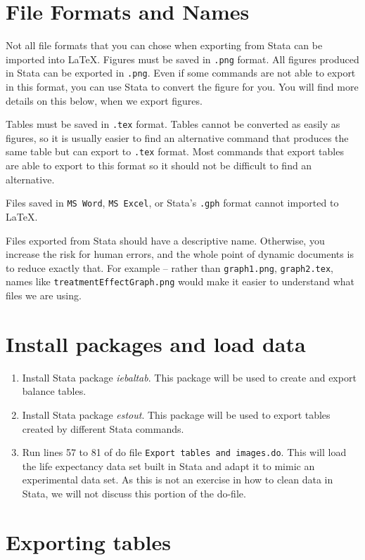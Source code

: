 \documentclass[]{article}
\begin{document}
\section{File Formats and Names}
Not all file formats that you can chose when exporting from Stata can be imported into {\LaTeX}. Figures must be saved in \texttt{.png} format. All figures produced in Stata can be exported in \texttt{.png}. Even if some commands are not able to export in this format, you can use Stata to convert the figure for you. You will find more details on this below, when we export figures. 

Tables must be saved in \texttt{.tex} format. Tables cannot be converted as easily as figures, so it is usually easier to find an alternative command that produces the same table but can export to \texttt{.tex} format. Most commands that export tables are able to export to this format so it should not be difficult to find an alternative.

Files saved in \texttt{MS Word}, \texttt{MS Excel}, or Stata's \texttt{.gph} format cannot imported to {\LaTeX}.

Files exported from Stata should have a descriptive name. Otherwise, you increase the risk for human errors, and the whole point of dynamic documents is to reduce exactly that. For example -- rather than \texttt{graph1.png}, \texttt{graph2.tex}, names like \texttt{treatmentEffectGraph.png} would make it easier to understand what files we are using.

\section{Install packages and load data}

\begin{enumerate}
	\item Install Stata package \emph{iebaltab}. This package will be used to create and export balance tables.
	\item Install Stata package \emph{estout}. This package will be used to export tables created by different Stata commands.
	\item Run lines 57 to 81 of do file \texttt{Export tables and images.do}. This will load the life expectancy data set built in Stata and adapt it to mimic an experimental data set. As this is not an exercise in how to clean data in Stata, we will not discuss this portion of the do-file.
\end{enumerate}


\section{Exporting tables}
\end{document}
